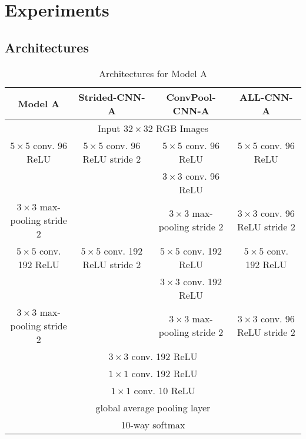 \section{Experiments}

\subsection{Architectures}
\begin{table}
  \centering
  \begin{tabular}{|c|c|c|c|}
    \hline
    Model A & Strided-CNN-A & ConvPool-CNN-A & ALL-CNN-A \\
    \hline
    \multicolumn{4}{|c|}{Input $32\times32$ RGB Images} \\
    \hline
    $5\times5$ conv. 96 ReLU & $5\times5$ conv. 96 ReLU stride 2 &  $5\times5$ conv. 96 ReLU & $5\times5$ conv. 96 ReLU \\
    & & $3\times3$ conv. 96 ReLU & \\
    \hline
    $3\times3$ max-pooling stride 2 & & $3\times3$ max-pooling stride 2& $3\times3$ conv. 96 ReLU stride 2 \\
    \hline
    $5\times5$ conv. 192 ReLU & $5\times5$ conv. 192 ReLU stride 2 &  $5\times5$ conv. 192 ReLU & $5\times5$ conv. 192 ReLU \\
    & & $3\times3$ conv. 192 ReLU & \\
    \hline
    $3\times3$ max-pooling stride 2 & & $3\times3$ max-pooling stride 2& $3\times3$ conv. 96 ReLU stride 2 \\
    \hline
    \multicolumn{4}{|c|}{$3\times3$ conv. 192 ReLU} \\
    \multicolumn{4}{|c|}{$1\times1$ conv. 192 ReLU} \\
    \multicolumn{4}{|c|}{$1\times1$ conv. 10 ReLU} \\
    \multicolumn{4}{|c|}{global average pooling layer} \\
    \multicolumn{4}{|c|}{10-way softmax} \\
  \end{tabular}
  \caption{Architectures for Model A}
\end{table}


